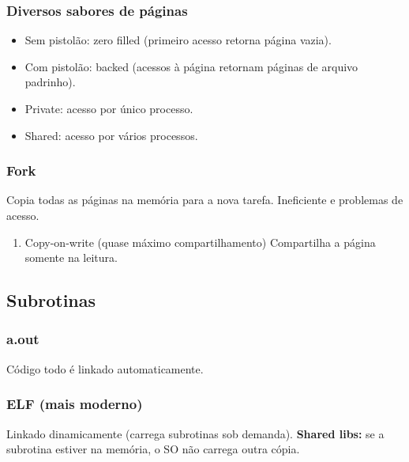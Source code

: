\documentclass[11pt]{article}
\begin{document}
\subsubsection{Diversos sabores de páginas}
\label{sec:orgfcfc667}
\begin{itemize}
\item Sem pistolão: zero filled (primeiro acesso retorna página vazia).
\item Com pistolão: backed (acessos à página retornam páginas de arquivo padrinho).

\item Private: acesso por único processo.
\item Shared: acesso por vários processos.
\end{itemize}

\subsubsection{Fork}
\label{sec:org58d480d}
Copia todas as páginas na memória para a nova tarefa. Ineficiente e problemas de
acesso.

\begin{enumerate}
\item Copy-on-write (quase máximo compartilhamento)
\label{sec:org5ae6354}
Compartilha a página somente na leitura.
\end{enumerate}

\subsection{Subrotinas}
\label{sec:org18eec0c}

\subsubsection{a.out}
\label{sec:orgd5bf3dd}
Código todo é linkado automaticamente.

\subsubsection{ELF (mais moderno)}
\label{sec:orga426256}
   Linkado dinamicamente (carrega subrotinas sob demanda). \textbf{Shared libs:} se a subrotina
estiver na memória, o SO não carrega outra cópia.
\end{document}
